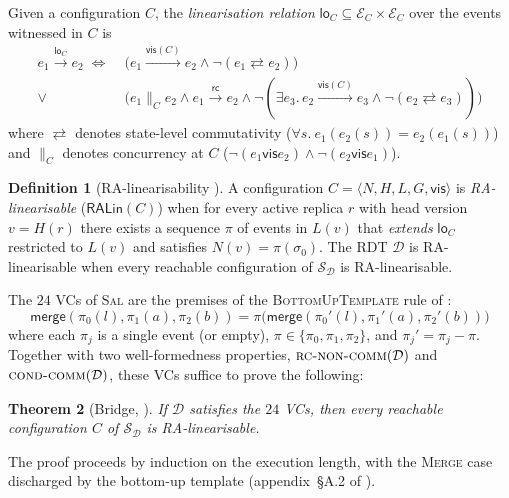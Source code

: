 \documentclass[11pt,a4paper]{article}
\newtheorem{theorem}{Theorem}[section]
\theoremstyle{definition}
\newtheorem{definition}[theorem]{Definition}
\theoremstyle{remark}
\newcommand{\RDT}{\ensuremath{\mathcal{D}}}
\newcommand{\mmerge}{\mathsf{merge}}
\newcommand{\mrc}{\mathsf{rc}}
\newcommand{\mvis}{\mathsf{vis}}
\newcommand{\mlo}{\mathsf{lo}}
\newcommand{\evs}{\mathcal{E}}
\newcommand{\init}{\sigma_0}
\newcommand{\commute}{\mathrel{\rightleftarrows}}
\newcommand{\RALin}{\mathsf{RALin}}
\newcommand{\Sal}{\textsc{Sal}}
\begin{document}
Given a configuration $C$, the \emph{linearisation relation}
$\mlo_C \subseteq \evs_C \times \evs_C$ over the events witnessed in
$C$ is
\begin{equation}
\label{eq:lo}
\begin{aligned}
e_1 \xrightarrow{\mlo_C} e_2
\;\iff\;
& \bigl(e_1 \xrightarrow{\mvis(C)} e_2 \wedge \neg (e_1 \commute e_2)\bigr) \\
\vee \; & \bigl(e_1 \mathbin{\|}_C e_2
   \wedge e_1 \xrightarrow{\mrc} e_2
   \wedge \neg (\exists e_3.\, e_2 \xrightarrow{\mvis(C)} e_3 \wedge \neg (e_2 \commute e_3)) \bigr)
\end{aligned}
\end{equation}
where $\commute$ denotes state-level commutativity
($\forall s.\ e_1(e_2(s)) = e_2(e_1(s))$) and $\mathbin{\|}_C$
denotes concurrency at $C$ ($\neg(e_1 \mvis e_2) \wedge \neg(e_2 \mvis e_1)$).

\begin{definition}[RA-linearisability \cite{sal2025}]
\label{def:ralin}
A configuration $C = \langle N, H, L, G, \mvis\rangle$ is
\emph{RA-linearisable} ($\RALin(C)$) when for every active replica
$r$ with head version $v = H(r)$ there exists a sequence $\pi$ of
events in $L(v)$ that \emph{extends} $\mlo_C$ restricted to $L(v)$
and satisfies $N(v) = \pi(\init)$. The RDT $\RDT$ is
RA-linearisable when every reachable configuration of
$\mathcal{S}_\RDT$ is RA-linearisable.
\end{definition}

The $24$ VCs of \Sal{} are the premises of the
\textsc{BottomUpTemplate} rule of \cite{sal2025}:
\begin{equation}
\label{eq:bottom-up-template}
  \mmerge(\pi_0(l), \pi_1(a), \pi_2(b))
  = \pi\bigl(\mmerge(\pi_0'(l), \pi_1'(a), \pi_2'(b))\bigr)
\end{equation}
where each $\pi_j$ is a single event (or empty), $\pi \in
\{\pi_0, \pi_1, \pi_2\}$, and $\pi_j' = \pi_j - \pi$. Together with
two well-formedness properties, $\textsc{rc-non-comm}(\RDT)$ and
$\textsc{cond-comm}(\RDT)$, these VCs suffice to prove the
following:

\begin{theorem}[Bridge, \cite{sal2025}]
\label{thm:bridge}
If $\RDT$ satisfies the $24$ VCs, then every reachable configuration
$C$ of $\mathcal{S}_\RDT$ is RA-linearisable.
\end{theorem}

The proof proceeds by induction on the execution length, with the
\textsc{Merge} case discharged by the bottom-up template
(appendix~\S A.2 of \cite{sal2025}).
\end{document}
